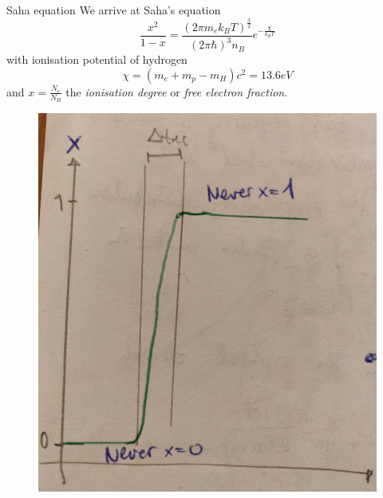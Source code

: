 \begin{mybox}{Saha equation}
	We arrive at Saha's equation\begin{equation}
		\frac{x^2}{1-x} = \frac{(2 \pi m_e k_B T)^{\frac{3}{2}}}{(2\pi \hbar)^3 n_B} e^{-\frac{\chi}{k_B T}}
	\end{equation}
	with ionisation potential of hydrogen 
	\begin{equation}
		\chi = (m_e+m_p-m_H) c^2 = 13.6 eV
	\end{equation}
	and $x=\frac{N_e}{N_B}$ the \emph{ionisation degree} or \emph{free electron fraction}. 
\end{mybox}
\begin{figure}[h!]
	\centering
	\includegraphics[width=0.5\linewidth]{gfx/sahaeq}
	\caption{}
	\label{fig:sahaeq}
\end{figure}



